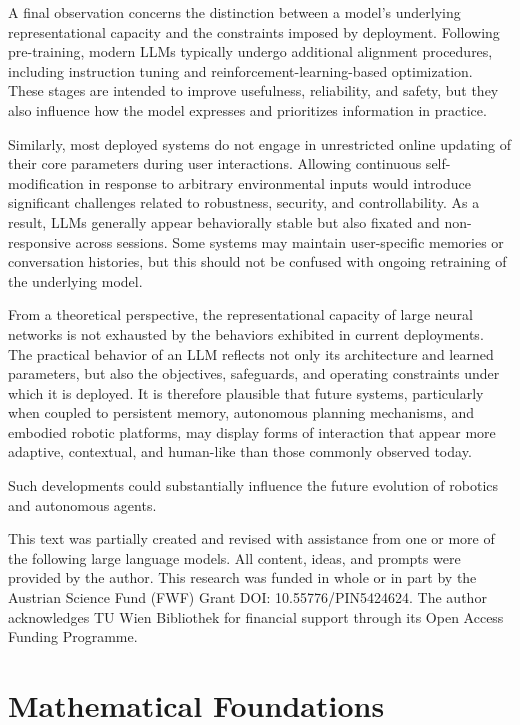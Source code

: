 \documentclass[%
  reprint,
  superscriptaddress,
  showpacs,
  showkeys,
  amsmath,amssymb,
  pra,
  longbibliography,
  floatfix,
  x11names
]{revtex4-2}
\begin{document}
A final observation concerns the distinction between a model's underlying representational capacity and the constraints imposed by deployment. Following pre-training, modern LLMs typically undergo additional alignment procedures, including instruction tuning and reinforcement-learning-based optimization. These stages are intended to improve usefulness, reliability, and safety, but they also influence how the model expresses and prioritizes information in practice.

Similarly, most deployed systems do not engage in unrestricted online updating of their core parameters during user interactions. Allowing continuous self-modification in response to arbitrary environmental inputs would introduce significant challenges related to robustness, security, and controllability. As a result, LLMs generally appear behaviorally stable but also fixated and non-responsive across sessions. Some systems may maintain user-specific memories or conversation histories, but this should not be confused with ongoing retraining of the underlying model.

From a theoretical perspective, the representational capacity of large neural networks is not exhausted by the behaviors exhibited in current deployments. The practical behavior of an LLM reflects not only its architecture and learned parameters, but also the objectives, safeguards, and operating constraints under which it is deployed. It is therefore plausible that future systems, particularly when coupled to persistent memory, autonomous planning mechanisms, and embodied robotic platforms, may display forms of interaction that appear more adaptive, contextual, and human-like than those commonly observed today.

Such developments could substantially influence the future evolution of robotics and autonomous agents.

\begin{acknowledgments}
This text was partially created and revised with assistance from one or more of the following large language models. All content, ideas, and prompts were provided by the author.
This research was funded in whole or in part by the  Austrian Science Fund (FWF) Grant DOI: 10.55776/PIN5424624.
The author acknowledges TU Wien Bibliothek for financial support through its Open Access Funding Programme.
\end{acknowledgments}


\appendix

\section{Mathematical Foundations}
\label{app:math}
\end{document}
